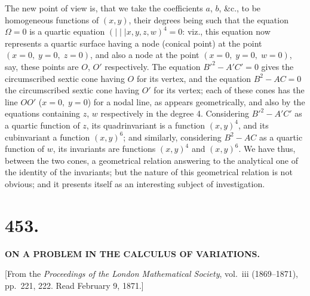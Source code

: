 \documentclass[11pt,a4paper]{article}
\begin{document}
The new point of view is, that we take the coefficients $a$, $b$, \&c., to be homogeneous functions of $(x, y)$, their degrees being such that the equation $\Omega = 0$ is a quartic equation $(\mid\mid\mid x, y, z, w)^4 = 0$: viz., this equation now represents a quartic surface having a node (conical point) at the point $(x = 0,\; y = 0,\; z = 0)$, and also a node at the point $(x = 0,\; y = 0,\; w = 0)$, say, these points are $O$, $O'$ respectively. The equation $B'^2 - A'C' = 0$ gives the circumscribed sextic cone having $O$ for its vertex, and the equation $B^2 - AC = 0$ the circumscribed sextic cone having $O'$ for its vertex; each of these cones has the line $OO'$ ($x = 0,\; y = 0$) for a nodal line, as appears geometrically, and also by the equations containing $z$, $w$ respectively in the degree 4. Considering $B'^2 - A'C'$ as a quartic function of $z$, its quadrinvariant is a function $(x, y)^4$, and its cubinvariant a function $(x, y)^6$; and similarly, considering $B^2 - AC$ as a quartic function of $w$, its invariants are functions $(x, y)^4$ and $(x, y)^6$. We have thus, between the two cones, a geometrical relation answering to the analytical one of the identity of the invariants; but the nature of this geometrical relation is not obvious; and it presents itself as an interesting subject of investigation.

\clearpage

\section*{\textbf{453.}}

\begin{center}
\textbf{ON A PROBLEM IN THE CALCULUS OF VARIATIONS.}
\end{center}

[From the \textit{Proceedings of the London Mathematical Society}, vol.~iii (1869--1871), pp.~221, 222. Read February 9, 1871.]
\end{document}

